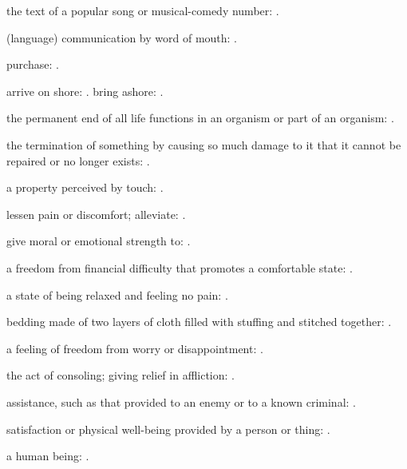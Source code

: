   the text of a popular song or musical-comedy number:   .

  (language) communication by word of mouth:   .

  purchase: .

  arrive on shore:   . bring ashore: .

  the permanent end of all life functions in an organism or part of an organism: .

  the termination of something by causing so much damage to it that it cannot be repaired or no longer exists:   .

  a property perceived by touch:   .

  lessen pain or discomfort; alleviate:   .

  give moral or emotional strength to:   .

  a freedom from financial difficulty that promotes a comfortable state:   .

  a state of being relaxed and feeling no pain:   .

  bedding made of two layers of cloth filled with stuffing and stitched together:   .

  a feeling of freedom from worry or disappointment: .

  the act of consoling; giving relief in affliction:   .

  assistance, such as that provided to an enemy or to a known criminal: .

  satisfaction or physical well-being provided by a person or thing: .

  a human being:   .

